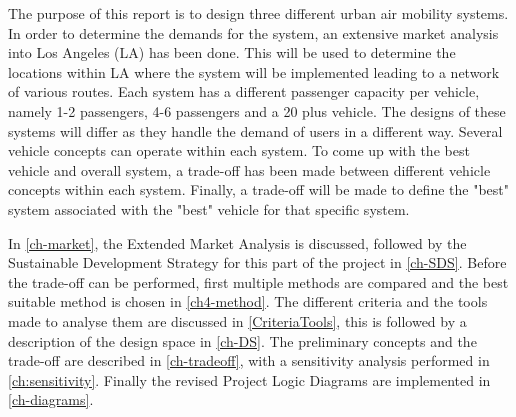 The purpose of this report is to design three different urban air mobility systems. In order to determine the demands for the system, an extensive market analysis into Los Angeles (LA) has been done. This will be used to determine the locations within LA where the system will be implemented leading to a network of various routes. Each system has a different passenger capacity per vehicle, namely 1-2 passengers, 4-6 passengers and a 20 plus vehicle. The designs of these systems will differ as they handle the demand of users in a different way. Several vehicle concepts can operate within each system. To come up with the best vehicle and overall system, a trade-off has been made between different vehicle concepts within each system. Finally, a trade-off will be made to define the "best" system associated with the "best" vehicle for that specific system. 

In \autoref{ch-market}, the Extended Market Analysis is discussed, followed by the Sustainable Development Strategy for this part of the project in \autoref{ch-SDS}. Before the trade-off can be performed, first multiple methods are compared and the best suitable method is chosen in \autoref{ch4-method}. The different criteria and the tools made to analyse them are discussed in \autoref{CriteriaTools}, this is followed by a description of the design space in \autoref{ch-DS}. The preliminary concepts and the trade-off are described in \autoref{ch-tradeoff}, with a sensitivity analysis performed in \autoref{ch:sensitivity}. Finally the revised Project Logic Diagrams are implemented in \autoref{ch-diagrams}.